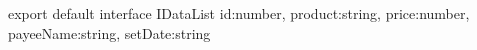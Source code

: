 export default interface IDataList {
    id:number,
    product:string,
    price:number,
    payeeName:string,
    setDate:string
}